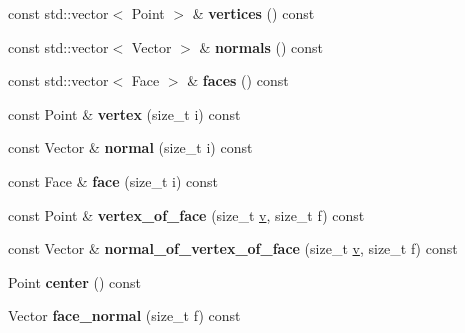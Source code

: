 \begin{DoxyCompactItemize}
\item 
\hypertarget{class_d_o_1_1_simple_mesh_ab0c76900f50e7e713d0fe8f17e0e516d}{const std\-::vector$<$ Point $>$ \& {\bfseries vertices} () const }\label{class_d_o_1_1_simple_mesh_ab0c76900f50e7e713d0fe8f17e0e516d}

\item 
\hypertarget{class_d_o_1_1_simple_mesh_a03017e9adf738c62ee22ab8a87a84f0f}{const std\-::vector$<$ Vector $>$ \& {\bfseries normals} () const }\label{class_d_o_1_1_simple_mesh_a03017e9adf738c62ee22ab8a87a84f0f}

\item 
\hypertarget{class_d_o_1_1_simple_mesh_a5afef1c0c4baa6ef3d6ae8320167b6c8}{const std\-::vector$<$ Face $>$ \& {\bfseries faces} () const }\label{class_d_o_1_1_simple_mesh_a5afef1c0c4baa6ef3d6ae8320167b6c8}

\item 
\hypertarget{class_d_o_1_1_simple_mesh_a6a3138e4eae655177f255b17090602fd}{const Point \& {\bfseries vertex} (size\-\_\-t i) const }\label{class_d_o_1_1_simple_mesh_a6a3138e4eae655177f255b17090602fd}

\item 
\hypertarget{class_d_o_1_1_simple_mesh_a5c05a2740b7e83d17ce5eaa706ac8381}{const Vector \& {\bfseries normal} (size\-\_\-t i) const }\label{class_d_o_1_1_simple_mesh_a5c05a2740b7e83d17ce5eaa706ac8381}

\item 
\hypertarget{class_d_o_1_1_simple_mesh_afb365293bbdd726f291c685172d5522a}{const Face \& {\bfseries face} (size\-\_\-t i) const }\label{class_d_o_1_1_simple_mesh_afb365293bbdd726f291c685172d5522a}

\item 
\hypertarget{class_d_o_1_1_simple_mesh_addf2fb5edd942f095b116f11afa62618}{const Point \& {\bfseries vertex\-\_\-of\-\_\-face} (size\-\_\-t \hyperlink{group___channel_accessors_ga1dd2524c5b8d3db33137eedb803fc2ce}{v}, size\-\_\-t f) const }\label{class_d_o_1_1_simple_mesh_addf2fb5edd942f095b116f11afa62618}

\item 
\hypertarget{class_d_o_1_1_simple_mesh_ae5ff33ab9086c49c55d3fc85fcfc929f}{const Vector \& {\bfseries normal\-\_\-of\-\_\-vertex\-\_\-of\-\_\-face} (size\-\_\-t \hyperlink{group___channel_accessors_ga1dd2524c5b8d3db33137eedb803fc2ce}{v}, size\-\_\-t f) const }\label{class_d_o_1_1_simple_mesh_ae5ff33ab9086c49c55d3fc85fcfc929f}

\item 
\hypertarget{class_d_o_1_1_simple_mesh_a609e38971a439a95017a7ff40adc85af}{Point {\bfseries center} () const }\label{class_d_o_1_1_simple_mesh_a609e38971a439a95017a7ff40adc85af}

\item 
\hypertarget{class_d_o_1_1_simple_mesh_a2f18d56c763ffde4b8de9f9d4e00c20e}{Vector {\bfseries face\-\_\-normal} (size\-\_\-t f) const }\label{class_d_o_1_1_simple_mesh_a2f18d56c763ffde4b8de9f9d4e00c20e}

\end{DoxyCompactItemize}



